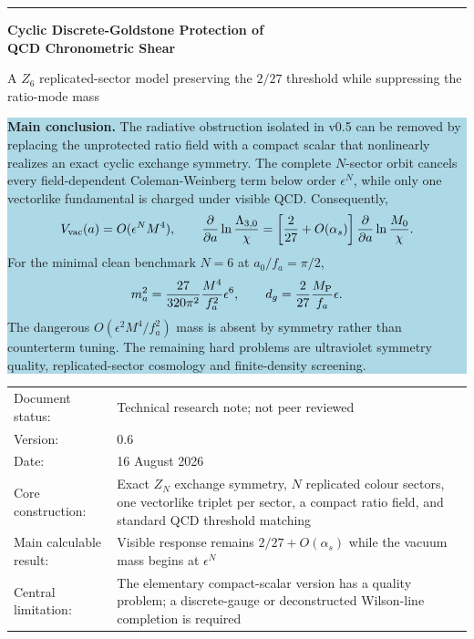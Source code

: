 \documentclass[11pt,a4paper]{article}
\begin{document}

\begin{titlepage}
\thispagestyle{empty}
\vspace*{7mm}

{\color{navy}\rule{\textwidth}{1.2pt}}
\vspace{7mm}

{\fontsize{21}{25}\selectfont\bfseries\color{navy} Cyclic Discrete-Goldstone Protection of\\ QCD Chronometric Shear\par}
\vspace{3mm}
{\Large A $Z_6$ replicated-sector model preserving the $2/27$ threshold while suppressing the ratio-mode mass\par}

\vspace{9mm}

\begin{center}
\begin{minipage}{0.93\textwidth}
\colorbox{lightblue}{\parbox{0.96\textwidth}{
\textbf{Main conclusion.} The radiative obstruction isolated in v0.5 can be removed by replacing the unprotected ratio field with a compact scalar that nonlinearly realizes an exact cyclic exchange symmetry. The complete $N$-sector orbit cancels every field-dependent Coleman-Weinberg term below order $\epsilon^N$, while only one vectorlike fundamental is charged under visible QCD. Consequently,
\[
V_{\rm vac}(a)=O(\epsilon^N M^4),
\qquad
\frac{\partial}{\partial a}\ln\frac{\Lambda_{3,0}}{\chi}
=\left[\frac{2}{27}+O(\alpha_s)\right]
\frac{\partial}{\partial a}\ln\frac{M_0}{\chi}.
\]
For the minimal clean benchmark $N=6$ at $a_0/f_a=\pi/2$,
\[
m_a^2=\frac{27}{320\pi^2}\frac{M^4}{f_a^2}\epsilon^6,
\qquad
d_g=\frac{2}{27}\frac{M_{\rm P}}{f_a}\epsilon.
\]
The dangerous $O(\epsilon^2M^4/f_a^2)$ mass is absent by symmetry rather than counterterm tuning. The remaining hard problems are ultraviolet symmetry quality, replicated-sector cosmology and finite-density screening.
}}
\end{minipage}
\end{center}

\vfill

\begin{tabularx}{\textwidth}{@{}p{}X@{}}
Document status: & Technical research note; not peer reviewed \\
Version: & 0.6 \\
Date: & 16 August 2026 \\
Core construction: & Exact $Z_N$ exchange symmetry, $N$ replicated colour sectors, one vectorlike triplet per sector, a compact ratio field, and standard QCD threshold matching \\
Main calculable result: & Visible response remains $2/27+O(\alpha_s)$ while the vacuum mass begins at $\epsilon^N$ \\
Central limitation: & The elementary compact-scalar version has a quality problem; a discrete-gauge or deconstructed Wilson-line completion is required
\end{tabularx}


\end{titlepage}
\end{document}

